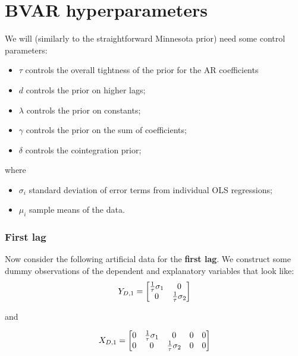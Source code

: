 \documentclass[
  letterpaper,
]{book}
\providecommand{\tightlist}{%
  \setlength{\itemsep}{0pt}\setlength{\parskip}{0pt}}\usepackage{longtable,booktabs,array}
\begin{document}
\hypertarget{bvar-hyperparameters}{%
\section{BVAR hyperparameters}\label{bvar-hyperparameters}}

We will (similarly to the straightforward Minnesota prior) need some
control parameters:

\begin{itemize}
\tightlist
\item
  \(\tau\) controls the overall tightness of the prior for the AR
  coefficients
\item
  \(d\) controls the prior on higher lags;
\item
  \(\lambda\) controls the prior on constants;
\item
  \(\gamma\) controls the prior on the sum of coefficients;
\item
  \(\delta\) controls the cointegration prior;
\end{itemize}

where

\begin{itemize}
\tightlist
\item
  \(\sigma_i\) standard deviation of error terms from individual OLS
  regressions;
\item
  \(\mu_i\) sample means of the data.
\end{itemize}

\hypertarget{first-lag}{%
\subsubsection{First lag}\label{first-lag}}

Now consider the following artificial data for the \textbf{first lag}.
We construct some dummy observations of the dependent and explanatory
variables that look like: \begin{equation}
  Y_{D,1} = \left[\begin{matrix}\frac{1}{\tau}\sigma_1 & 0 \cr
    0 & \frac{1}{\tau}\sigma_2\end{matrix}\right]
\end{equation}

and

\begin{equation}
  X_{D,1} = \left [ \begin{matrix}0 & \frac{1}{\tau}\sigma_1 & 0 & 0 & 0\cr
    0 & 0 & \frac{1}{\tau}\sigma_2 & 0 & 0\end{matrix}\right]
\end{equation}
\end{document}
